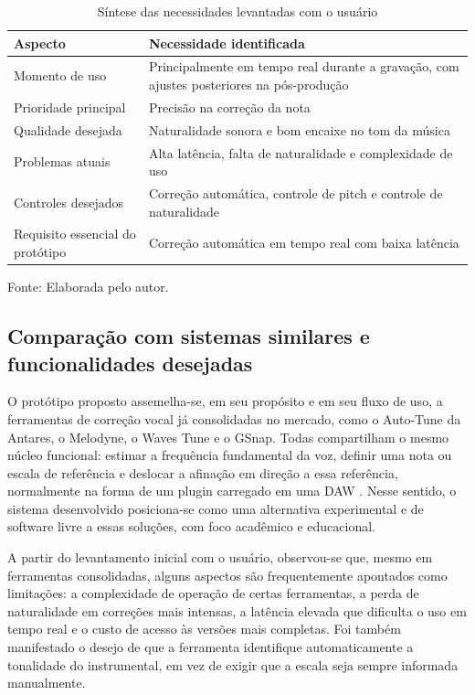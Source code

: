 \begin{table}[H]
\centering
\caption{Síntese das necessidades levantadas com o usuário}
\begin{tabular}{|p{5cm}|p{8cm}|}
\hline
\textbf{Aspecto} & \textbf{Necessidade identificada} \\
\hline
Momento de uso & Principalmente em tempo real durante a gravação, com ajustes posteriores na pós-produção \\
\hline
Prioridade principal & Precisão na correção da nota \\
\hline
Qualidade desejada & Naturalidade sonora e bom encaixe no tom da música \\
\hline
Problemas atuais & Alta latência, falta de naturalidade e complexidade de uso \\
\hline
Controles desejados & Correção automática, controle de pitch e controle de naturalidade \\
\hline
Requisito essencial do protótipo & Correção automática em tempo real com baixa latência \\
\hline
\end{tabular}
\small Fonte: Elaborada pelo autor.
\end{table}

\subsection{Comparação com sistemas similares e funcionalidades desejadas}

O protótipo proposto assemelha-se, em seu propósito e em seu fluxo de uso, a
ferramentas de correção vocal já consolidadas no mercado, como o Auto-Tune da
Antares, o Melodyne, o Waves Tune e o GSnap. Todas compartilham o mesmo núcleo
funcional: estimar a frequência fundamental da voz, definir uma nota ou escala de
referência e deslocar a afinação em direção a essa referência, normalmente na forma
de um plugin carregado em uma DAW \cite{antares_autotune_pro,ableton_manual}. Nesse
sentido, o sistema desenvolvido posiciona-se como uma alternativa experimental e de
software livre a essas soluções, com foco acadêmico e educacional.

A partir do levantamento inicial com o usuário, observou-se que, mesmo em
ferramentas consolidadas, alguns aspectos são frequentemente apontados como
limitações: a complexidade de operação de certas ferramentas, a perda de
naturalidade em correções mais intensas, a latência elevada que dificulta o uso em
tempo real e o custo de acesso às versões mais completas. Foi também manifestado o
desejo de que a ferramenta identifique automaticamente a tonalidade do instrumental,
em vez de exigir que a escala seja sempre informada manualmente.

